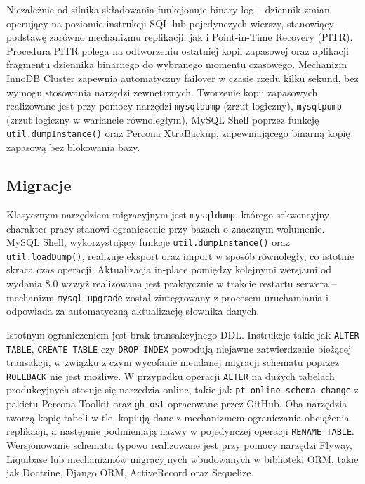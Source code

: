 Niezależnie od silnika składowania funkcjonuje binary log -- dziennik zmian
operujący na poziomie instrukcji SQL lub pojedynczych wierszy, stanowiący
podstawę zarówno mechanizmu replikacji, jak i Point-in-Time Recovery (PITR).
Procedura PITR polega na odtworzeniu ostatniej kopii zapasowej oraz aplikacji
fragmentu dziennika binarnego do wybranego momentu czasowego. Mechanizm
InnoDB Cluster zapewnia automatyczny failover w czasie rzędu kilku sekund,
bez wymogu stosowania narzędzi zewnętrznych. Tworzenie kopii zapasowych
realizowane jest przy pomocy narzędzi \texttt{mysqldump} (zrzut logiczny),
\texttt{mysqlpump} (zrzut logiczny w wariancie równoległym), MySQL Shell
poprzez funkcję \texttt{util.dumpInstance()} oraz Percona XtraBackup,
zapewniającego binarną kopię zapasową bez blokowania bazy.

\subsection{Migracje}

Klasycznym narzędziem migracyjnym jest \texttt{mysqldump}, którego sekwencyjny
charakter pracy stanowi ograniczenie przy bazach o znacznym wolumenie. MySQL
Shell, wykorzystujący funkcje \texttt{util.dumpInstance()} oraz
\texttt{util.loadDump()}, realizuje eksport oraz import w sposób równoległy,
co istotnie skraca czas operacji. Aktualizacja in-place pomiędzy kolejnymi
wersjami od wydania 8.0 wzwyż realizowana jest praktycznie w trakcie restartu
serwera -- mechanizm \texttt{mysql\_upgrade} został zintegrowany z procesem
uruchamiania i odpowiada za automatyczną aktualizację słownika danych.

Istotnym ograniczeniem jest brak transakcyjnego DDL. Instrukcje takie jak
\texttt{ALTER TABLE}, \texttt{CREATE TABLE} czy \texttt{DROP INDEX} powodują
niejawne zatwierdzenie bieżącej transakcji, w związku z czym wycofanie
nieudanej migracji schematu poprzez \texttt{ROLLBACK} nie jest możliwe.
W przypadku operacji \texttt{ALTER} na dużych tabelach produkcyjnych stosuje
się narzędzia online, takie jak \texttt{pt-online-schema-change} z pakietu
Percona Toolkit oraz \texttt{gh-ost} opracowane przez GitHub. Oba narzędzia
tworzą kopię tabeli w tle, kopiują dane z mechanizmem ograniczania obciążenia
replikacji, a następnie podmieniają nazwy w pojedynczej operacji
\texttt{RENAME TABLE}. Wersjonowanie schematu typowo realizowane jest przy
pomocy narzędzi Flyway, Liquibase lub mechanizmów migracyjnych wbudowanych
w biblioteki ORM, takie jak Doctrine, Django ORM, ActiveRecord oraz Sequelize.

